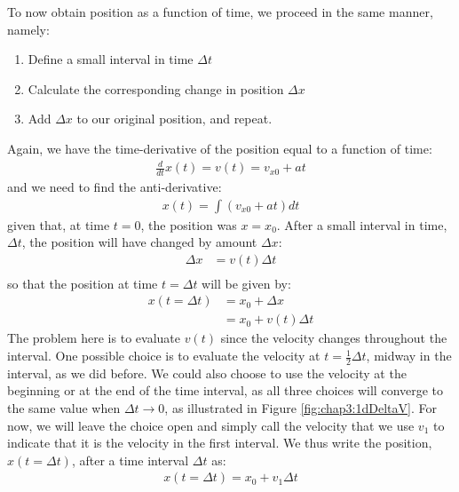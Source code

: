 To now obtain position as a function of time, we proceed in the same manner, namely:
\begin{enumerate}
\item Define a small interval in time $\Delta t$
\item Calculate the corresponding change in position $\Delta x$
\item Add $\Delta x$ to our original position, and repeat.
\end{enumerate}

Again, we have the time-derivative of the position equal to a function of time:
\begin{align*}
\frac{d}{dt}x(t)=v(t)=v_{x0}+at
\end{align*}
and we need to find the anti-derivative:
\begin{align*}
x(t) = \int \left(  v_{x0}+at \right) dt 
\end{align*}
given that, at time $t=0$, the position was $x=x_0$. After a small interval in time, $\Delta t$, the position will have changed by amount $\Delta x$:
\begin{align*}
\Delta x &= v(t) \Delta t\\
\end{align*}
so that the position at time $t=\Delta t$ will be given by:
\begin{align*}
x(t=\Delta t) &= x_0+ \Delta x\\
& = x_0+v(t) \Delta t
\end{align*}
The problem here is to evaluate $v(t)$ since the velocity changes throughout the interval. One possible choice is to evaluate the velocity at $t = \frac{1}{2}\Delta t$, midway in the interval, as we did before. We could also choose to use the velocity at the beginning or at the end of the time interval, as all three choices will converge to the same value when $\Delta t \to 0$, as illustrated in Figure \ref{fig:chap3:1dDeltaV}. For now, we will leave the choice open and simply call the velocity that we use $v_1$ to indicate that it is the velocity in the first interval. We thus write the position, $x(t=\Delta t)$, after a time interval $\Delta t$ as:
\begin{align*}
x(t=\Delta t) = x_0+v_1\Delta t
\end{align*}
